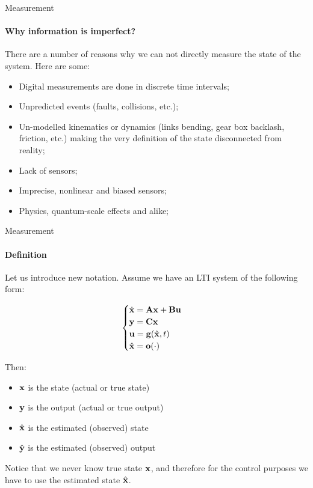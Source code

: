 \documentclass{beamer}
\begin{document}
\begin{frame}{Measurement}
\framesubtitle{Why information is imperfect?}
\begin{flushleft}

There are a number of reasons why we can not directly measure the state of the system. Here are some:

\begin{itemize}
\item Digital measurements are done in discrete time intervals;
\item Unpredicted events (faults, collisions, etc.);
\item Un-modelled kinematics or dynamics (links bending, gear box backlash,  friction, etc.) making the very definition of the state disconnected from reality;
\item Lack of sensors;
\item Imprecise, nonlinear and biased sensors;
\item Physics, quantum-scale effects and alike;
\end{itemize}

\end{flushleft}
\end{frame}

\begin{frame}{Measurement}
\framesubtitle{Definition}
\begin{flushleft}

Let us introduce new notation. Assume we have an LTI system of the following form:

\begin{equation}
\begin{cases}
\dot {\mathbf{x}} = \mathbf{A} \mathbf{x} + \mathbf{B} \mathbf{u} \\
\mathbf{y} = \mathbf{C} \mathbf{x} \\
\mathbf{u} = \mathbf{g}(\hat{\mathbf{x}}, t)\\
\hat{\mathbf{x}} = \mathbf{o}(\cdot)
\end{cases}
\end{equation}

Then:

\begin{itemize}
\item $\mathbf{x}$ is the state (actual or true state)
\item $\mathbf{y}$ is the output (actual or true output)
\item $\hat{\mathbf{x}}$ is the estimated (observed) state
\item $\hat{\mathbf{y}}$ is the estimated (observed) output
\end{itemize}

Notice that we never know true state $\mathbf{x}$, and therefore for the control purposes we have to use the estimated state $\hat{\mathbf{x}}$.

\end{flushleft}
\end{frame}
\end{document}

